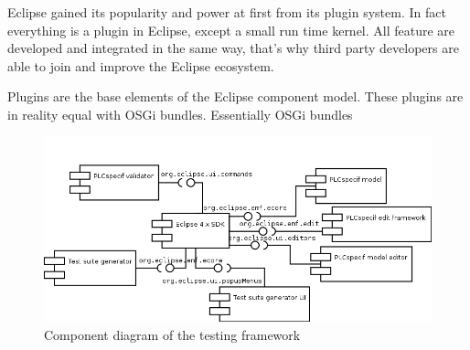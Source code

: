 Eclipse gained its popularity and power at first from its plugin system. In fact everything is a plugin in Eclipse, except a small run time kernel. All feature are developed and integrated in the same way, that's why third party developers are able to join and improve the Eclipse ecosystem. 

Plugins are the base elements of the Eclipse component model. These plugins are in reality equal with OSGi bundles. Essentially OSGi bundles 

\begin{figure}[htp]
\centering
\includegraphics[scale=0.5]{figures/design_components.png}
\caption{Component diagram of the testing framework}
\label{fig:designcomponents}
\end{figure}



